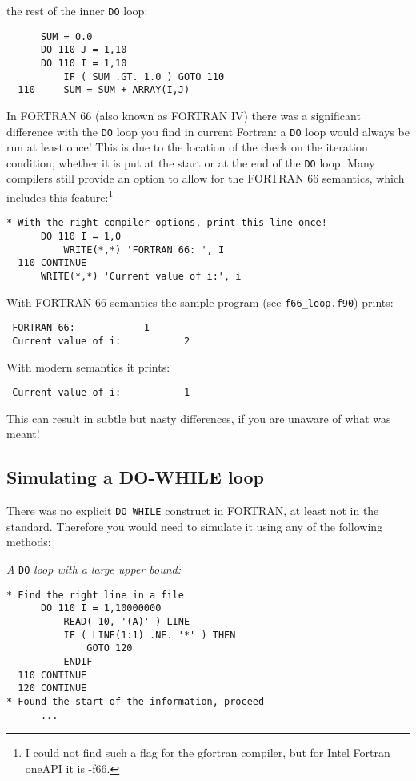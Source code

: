 the rest of the inner \verb+DO+ loop:
%
\begin{verbatim}
      SUM = 0.0
      DO 110 J = 1,10
      DO 110 I = 1,10
          IF ( SUM .GT. 1.0 ) GOTO 110
  110     SUM = SUM + ARRAY(I,J)
\end{verbatim}
%
In FORTRAN 66 (also known as FORTRAN IV) there was a significant difference with
the \verb+DO+ loop you find in current Fortran: a \verb+DO+ loop would always
be run at least once! This is due to the location of the check on the iteration
condition, whether it is put at the start or at the end of the \verb+DO+ loop.
Many compilers still provide an option to allow for the FORTRAN 66 semantics,\cite{Intel}
which includes this feature:\footnote{I could not find such a flag for the
gfortran compiler, but for Intel Fortran oneAPI it is -f66.}
%
\begin{verbatim}
* With the right compiler options, print this line once!
      DO 110 I = 1,0
          WRITE(*,*) 'FORTRAN 66: ', I
  110 CONTINUE
      WRITE(*,*) 'Current value of i:', i
\end{verbatim}
%
With FORTRAN 66 semantics the sample program (see \verb+f66_loop.f90+) prints:
%
\begin{verbatim}
 FORTRAN 66:            1
 Current value of i:           2
\end{verbatim}
With modern semantics it prints:
%
\begin{verbatim}
 Current value of i:           1
\end{verbatim}
%
This can result in subtle but nasty differences, if you are unaware of what
was meant!


\subsection{Simulating a DO-WHILE loop}
There was no explicit \verb+DO WHILE+ construct in FORTRAN, at least not
in the standard. Therefore you would need to simulate it using any of the
following methods:

\vspace{\baselineskip}
\noindent \emph{A} \verb+DO+ \emph{loop with a large upper bound:}
\begin{verbatim}
* Find the right line in a file
      DO 110 I = 1,10000000
          READ( 10, '(A)' ) LINE
          IF ( LINE(1:1) .NE. '*' ) THEN
              GOTO 120
          ENDIF
  110 CONTINUE
  120 CONTINUE
* Found the start of the information, proceed
      ...
\end{verbatim}

